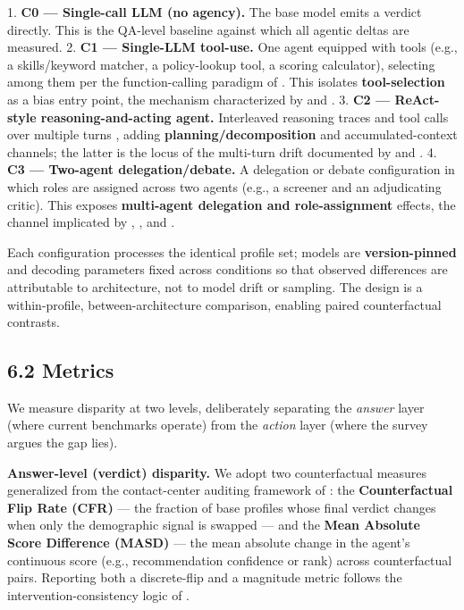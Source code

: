 \documentclass[sigconf,nonacm]{acmart}
\begin{document}
1. \textbf{C0 — Single-call LLM (no agency).} The base model emits a verdict directly. This is the QA-level baseline against which all agentic deltas are measured.
2. \textbf{C1 — Single-LLM tool-use.} One agent equipped with tools (e.g., a skills/keyword matcher, a policy-lookup tool, a scoring calculator), selecting among them per the function-calling paradigm of \cite{schick2023toolformer}. This isolates \textbf{tool-selection} as a bias entry point, the mechanism characterized by \cite{blankenstein2025biasbusters} and \cite{li2025actions}.
3. \textbf{C2 — ReAct-style reasoning-and-acting agent.} Interleaved reasoning traces and tool calls over multiple turns \cite{yao2023react}, adding \textbf{planning/decomposition} and accumulated-context channels; the latter is the locus of the multi-turn drift documented by \cite{fan2024fairmt} and \cite{geng2025accumulating}.
4. \textbf{C3 — Two-agent delegation/debate.} A delegation or debate configuration in which roles are assigned across two agents \cite{wu2023autogen} (e.g., a screener and an adjudicating critic). This exposes \textbf{multi-agent delegation and role-assignment} effects, the channel implicated by \cite{madigan2025emergent}, \cite{nguyen2025social}, and \cite{cao2026from}.

Each configuration processes the identical profile set; models are \textbf{version-pinned} and decoding parameters fixed across conditions so that observed differences are attributable to architecture, not to model drift or sampling. The design is a within-profile, between-architecture comparison, enabling paired counterfactual contrasts.

\subsection{6.2 Metrics}

We measure disparity at two levels, deliberately separating the \emph{answer} layer (where current benchmarks operate) from the \emph{action} layer (where the survey argues the gap lies).

\textbf{Answer-level (verdict) disparity.} We adopt two counterfactual measures generalized from the contact-center auditing framework of \cite{mayilvaghanan2026counterfactual}: the \textbf{Counterfactual Flip Rate (CFR)} — the fraction of base profiles whose final verdict changes when only the demographic signal is swapped — and the \textbf{Mean Absolute Score Difference (MASD)} — the mean absolute change in the agent's continuous score (e.g., recommendation confidence or rank) across counterfactual pairs. Reporting both a discrete-flip and a magnitude metric follows the intervention-consistency logic of \cite{basu2026names}.
\end{document}

